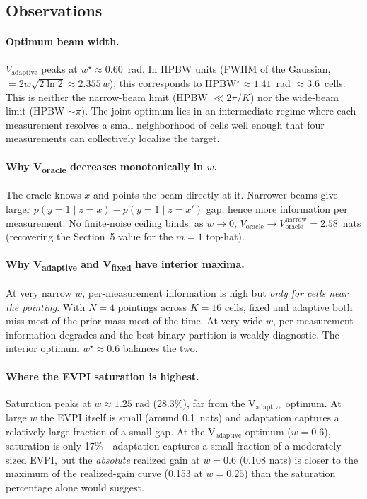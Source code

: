 \documentclass[11pt,a4paper]{article}
\begin{document}
\subsection{Observations}

\paragraph{Optimum beam width.}
$V_{\text{adaptive}}$ peaks at $w^\star \approx 0.60$~rad.  In HPBW units (FWHM of the Gaussian, $= 2 w \sqrt{2 \ln 2} \approx 2.355\,w$), this corresponds to $\text{HPBW}^\star \approx 1.41$~rad $\approx 3.6$~cells.  This is neither the narrow-beam limit (HPBW $\ll 2\pi/K$) nor the wide-beam limit (HPBW $\sim \pi$).  The joint optimum lies in an intermediate regime where each measurement resolves a small neighborhood of cells well enough that four measurements can collectively localize the target.

\paragraph{Why V\textsubscript{oracle} decreases monotonically in $w$.}  The oracle knows $x$ and points the beam directly at it.  Narrower beams give larger $p(y=1 \mid z = x) - p(y=1 \mid z = x')$ gap, hence more information per measurement.  No finite-noise ceiling binds: as $w \to 0$, $V_{\text{oracle}} \to V_{\text{oracle}}^{\text{narrow}} = 2.58$~nats (recovering the Section~5 value for the $m = 1$ top-hat).

\paragraph{Why V\textsubscript{adaptive} and V\textsubscript{fixed} have interior maxima.}  At very narrow $w$, per-measurement information is high but \emph{only for cells near the pointing}.  With $N = 4$ pointings across $K = 16$ cells, fixed and adaptive both miss most of the prior mass most of the time.  At very wide $w$, per-measurement information degrades and the best binary partition is weakly diagnostic.  The interior optimum $w^\star \approx 0.6$ balances the two.

\paragraph{Where the EVPI saturation is highest.}  Saturation peaks at $w \approx 1.25$ rad (28.3\%), far from the V$_{\text{adaptive}}$ optimum.  At large $w$ the EVPI itself is small (around 0.1~nats) and adaptation captures a relatively large fraction of a small gap.  At the V$_{\text{adaptive}}$ optimum ($w = 0.6$), saturation is only 17\%---adaptation captures a small fraction of a moderately-sized EVPI, but the \emph{absolute} realized gain at $w = 0.6$ (0.108 nats) is closer to the maximum of the realized-gain curve (0.153 at $w = 0.25$) than the saturation percentage alone would suggest.
\end{document}
